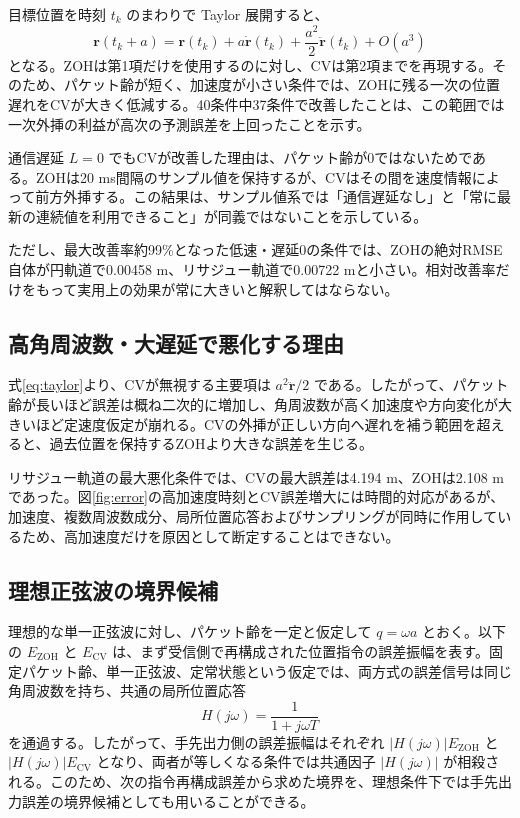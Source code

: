 \documentclass[11pt,a4paper]{article}
\newcommand{\vect}[1]{\bm{#1}}
\begin{document}
目標位置を時刻 $t_k$ のまわりで Taylor 展開すると、
\begin{equation}
\vect r(t_k+a)=\vect r(t_k)+a\dot{\vect r}(t_k)
+\frac{a^2}{2}\ddot{\vect r}(t_k)+O(a^3)
\label{eq:taylor}
\end{equation}
となる。ZOHは第1項だけを使用するのに対し、CVは第2項までを再現する。そのため、パケット齢が短く、加速度が小さい条件では、ZOHに残る一次の位置遅れをCVが大きく低減する。40条件中37条件で改善したことは、この範囲では一次外挿の利益が高次の予測誤差を上回ったことを示す。

通信遅延 $L=0$ でもCVが改善した理由は、パケット齢が0ではないためである。ZOHは20 ms間隔のサンプル値を保持するが、CVはその間を速度情報によって前方外挿する。この結果は、サンプル値系では「通信遅延なし」と「常に最新の連続値を利用できること」が同義ではないことを示している。

ただし、最大改善率約99\%となった低速・遅延0の条件では、ZOHの絶対RMSE自体が円軌道で0.00458 m、リサジュー軌道で0.00722 mと小さい。相対改善率だけをもって実用上の効果が常に大きいと解釈してはならない。

\subsection{高角周波数・大遅延で悪化する理由}

式\eqref{eq:taylor}より、CVが無視する主要項は $a^2\ddot{\vect r}/2$ である。したがって、パケット齢が長いほど誤差は概ね二次的に増加し、角周波数が高く加速度や方向変化が大きいほど定速度仮定が崩れる。CVの外挿が正しい方向へ遅れを補う範囲を超えると、過去位置を保持するZOHより大きな誤差を生じる。

リサジュー軌道の最大悪化条件では、CVの最大誤差は4.194 m、ZOHは2.108 mであった。図\ref{fig:error}の高加速度時刻とCV誤差増大には時間的対応があるが、加速度、複数周波数成分、局所位置応答およびサンプリングが同時に作用しているため、高加速度だけを原因として断定することはできない。

\subsection{理想正弦波の境界候補}

理想的な単一正弦波に対し、パケット齢を一定と仮定して $q=\omega a$ とおく。以下の $E_{\mathrm{ZOH}}$ と $E_{\mathrm{CV}}$ は、まず受信側で再構成された位置指令の誤差振幅を表す。固定パケット齢、単一正弦波、定常状態という仮定では、両方式の誤差信号は同じ角周波数を持ち、共通の局所位置応答
\begin{equation}
\label{eq:local-frequency-response}
H(j\omega)=\frac{1}{1+j\omega T}
\end{equation}
を通過する。したがって、手先出力側の誤差振幅はそれぞれ $|H(j\omega)|E_{\mathrm{ZOH}}$ と $|H(j\omega)|E_{\mathrm{CV}}$ となり、両者が等しくなる条件では共通因子 $|H(j\omega)|$ が相殺される。このため、次の指令再構成誤差から求めた境界を、理想条件下では手先出力誤差の境界候補としても用いることができる。
\end{document}
